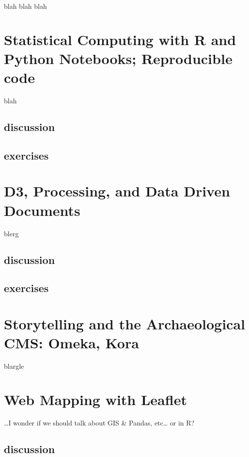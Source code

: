 \documentclass[english,]{book}
\begin{document}
blah blah blah

\section{Statistical Computing with R and Python Notebooks; Reproducible
code}\label{statistical-computing-with-r-and-python-notebooks-reproducible-code}

blah

\subsection{discussion}\label{discussion-5}

\subsection{exercises}\label{exercises-10}

\section{D3, Processing, and Data Driven
Documents}\label{d3-processing-and-data-driven-documents}

blerg

\subsection{discussion}\label{discussion-6}

\subsection{exercises}\label{exercises-11}

\section{Storytelling and the Archaeological CMS: Omeka,
Kora}\label{storytelling-and-the-archaeological-cms-omeka-kora}

blargle

\section{Web Mapping with Leaflet}\label{web-mapping-with-leaflet}

\ldots{}I wonder if we should talk about GIS \& Pandas, etc\ldots{} or
in R?

\subsection{discussion}\label{discussion-7}
\end{document}
